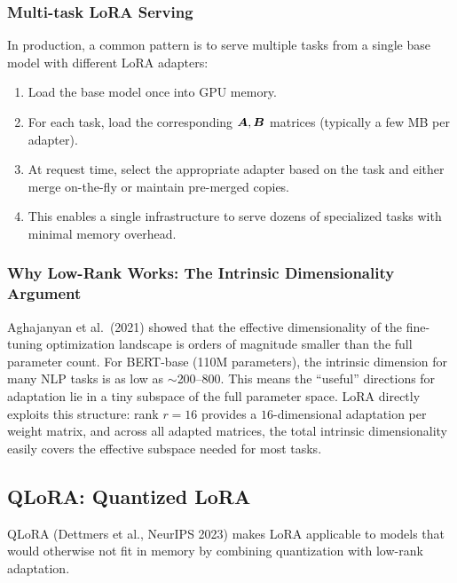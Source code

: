 \subsubsection{Multi-task LoRA Serving}

In production, a common pattern is to serve multiple tasks from a single base
model with different LoRA adapters:

\begin{enumerate}
    \item Load the base model once into GPU memory.
    \item For each task, load the corresponding $\bm{A}, \bm{B}$ matrices
          (typically a few MB per adapter).
    \item At request time, select the appropriate adapter based on the task
          and either merge on-the-fly or maintain pre-merged copies.
    \item This enables a single infrastructure to serve dozens of specialized
          tasks with minimal memory overhead.
\end{enumerate}

\subsubsection{Why Low-Rank Works: The Intrinsic Dimensionality Argument}

\begin{keyinsight}
Aghajanyan et al.\ (2021) showed that the effective dimensionality of the
fine-tuning optimization landscape is orders of magnitude smaller than the
full parameter count.  For BERT-base (110M parameters), the intrinsic
dimension for many NLP tasks is as low as $\sim$200--800.  This means the
``useful'' directions for adaptation lie in a tiny subspace of the full
parameter space.  LoRA directly exploits this structure: rank $r = 16$ provides
a $16$-dimensional adaptation per weight matrix, and across all adapted matrices,
the total intrinsic dimensionality easily covers the effective subspace needed
for most tasks.
\end{keyinsight}

\subsection{QLoRA: Quantized LoRA}
\label{sec:qlora}

QLoRA (Dettmers et al., NeurIPS 2023) makes LoRA applicable to models that
would otherwise not fit in memory by combining quantization with low-rank
adaptation.

